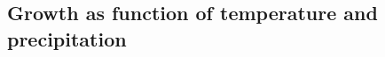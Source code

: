 \documentclass[12pt]{iopart}
\begin{document}



\subsection{Growth as function of temperature and precipitation}
\end{document}
